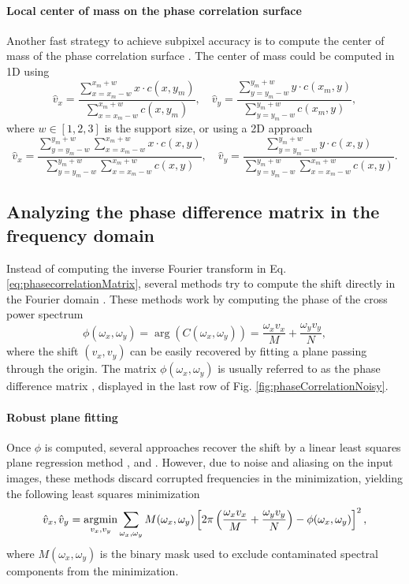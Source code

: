 \paragraph{Local center of mass on the phase correlation surface}
Another fast strategy to achieve subpixel accuracy is to compute the center of mass of the phase correlation surface \cite{Alba_2015, leprince2007automatic}. The center of mass could be computed in 1D using 
\begin{equation}
\hat{v}_x = \frac{\sum_{x=x_m-w}^{x_m+w} x \cdot c(x,y_m)}{\sum_{x=x_m-w}^{x_m+w} c(x,y_m)}, \quad \hat{v}_y = \frac{\sum_{y=y_m-w}^{y_m+w} y \cdot c(x_m,y)}{\sum_{y=y_m-w}^{y_m+w} c(x_m,y)},
\end{equation}
where $w \in [1,2,3]$ is the support size, or using a 2D approach
\begin{equation}
\hat{v}_x = \frac{\sum_{y=y_m-w}^{y_m+w}\sum_{x=x_m-w}^{x_m+w} x \cdot c(x,y)}{\sum_{y=y_m-w}^{y_m+w}\sum_{x=x_m-w}^{x_m+w} c(x,y)}, \quad \hat{v}_y = \frac{\sum_{y=y_m-w}^{y_m+w} y \cdot  c(x,y)}{\sum_{y=y_m-w}^{y_m+w}\sum_{x=x_m-w}^{x_m+w} c(x,y)}.
\end{equation}

\subsection{Analyzing the phase difference matrix in the frequency domain} 
\label{sec:phaseCorrelationFrequency}
Instead of computing the inverse Fourier transform in Eq. \eqref{eq:phasecorrelationMatrix}, several methods try to compute the shift directly in the Fourier domain \cite{Stone_2001, Balci_2005}. These methods work by computing the phase of the cross power spectrum
\begin{equation}
	\phi(\omega_x,\omega_y) = \arg\left( C(\omega_x,\omega_y)\right) = \frac{\omega_x v_x}{M} + \frac{\omega_y v_y}{N},
	\label{eq:phaseDifferenceMatrix}
\end{equation}
where the shift $(v_x, v_y)$ can be easily recovered by fitting a plane passing through the origin. The matrix $\phi(\omega_x, \omega_y)$ is usually referred to as the phase difference matrix \cite{Balci_2005}, displayed in the last row of Fig. \ref{fig:phaseCorrelationNoisy}.

\paragraph{Robust plane fitting}
Once $\phi$ is computed, several approaches recover the shift by a linear least squares plane regression method \cite{Stone_2001}, \cite{Knutsson2005} and \cite{Sidick2007Adaptive}. However, due to noise and aliasing on the input images, these methods discard corrupted frequencies in the minimization, yielding the following least squares minimization
\begin{equation}
	\hat{v}_x, \hat{v}_y =  \operatorname*{\arg\!\min}_{v_x,v_y} \sum_{\omega_x, \omega_y} M(\omega_x, \omega_y) \left[2 \pi \left(\frac{\omega_x v_x}{M} + \frac{\omega_y v_y}{N}\right) - \phi(\omega_x, \omega_y)\right]^2,
	\label{eq:minPLaneFittingPhaseCorrelation}
\end{equation}
where $M(\omega_x, \omega_y)$ is the binary mask used to exclude contaminated spectral components from the minimization. 


